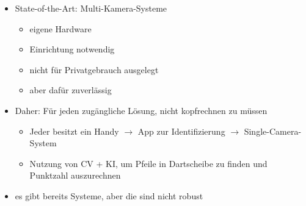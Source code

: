 \begin{itemize}
    \item State-of-the-Art: Multi-Kamera-Systeme
    \begin{itemize}
        \item eigene Hardware
        \item Einrichtung notwendig
        \item nicht für Privatgebrauch ausgelegt
        \item aber dafür zuverlässig
    \end{itemize}
    \item Daher: Für jeden zugängliche Lösung, nicht kopfrechnen zu müssen
    \begin{itemize}
        \item Jeder besitzt ein Handy $\rightarrow$ App zur Identifizierung $\rightarrow$ Single-Camera-System
        \item Nutzung von CV + KI, um Pfeile in Dartscheibe zu finden und Punktzahl auszurechnen
    \end{itemize}

    \item es gibt bereits Systeme, aber die sind nicht robust \cite{deepdarts, dartscore_repo}
\end{itemize}

\fi